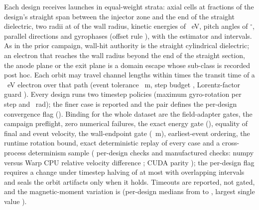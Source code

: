 Each design receives \WlgLaunchesPerCase{} launches in \WlgStrataPerCase{} equal-weight
strata: \WlgCellCount{} axial cells at fractions \WlgCellFractions{} of the design's
straight span between the injector zone and the end of the straight dielectric, two
radii at \WlgRadiusFractions{} of the wall radius, kinetic energies of
\WlgEnergies{}~eV, pitch angles of \WlgPitches$^\circ$, parallel directions
\WlgDirections{} and \WlgGyrophaseCount{} gyrophases (offset rule
\WlgGyrophaseOffsetRule), with the \texttt{\WlgEstimator} estimator and
\texttt{\WlgIntervalMethod} intervals. As in the prior campaign, wall-hit authority
is the straight cylindrical dielectric; an electron that reaches the wall radius
beyond the end of the straight section, the anode plane or the exit plane is a
domain escape whose sub-class is recorded post hoc. Each orbit may travel
\WlgMaxPathLengths{} channel lengths within \WlgMaxTimeFactor{} times the transit
time of a \WlgSlowestEnergy{}~eV electron over that path (event tolerance
\WlgEventTolerance{}~m, step budget \WlgMaxSteps, Lorentz-factor guard
\WlgMaxGamma). Every design runs two timestep policies (maximum gyro-rotation per
step \WlgRotationN{} and \WlgRotationTwoN{}~rad); the finer case is reported and the
pair defines the per-design convergence flag (\WlgReportedCase). Binding for the
whole dataset are the field-adapter gates, the campaign preflight, zero numerical
failures, the exact energy gate (\WlgEnergyGate), equality of final and event
velocity, the wall-endpoint gate (\WlgWallEndpointGate{}~m), earliest-event
ordering, the runtime rotation bound, exact deterministic replay of every case and
a cross-process determinism sample (\WlgPerDesignChecks{} per-design checks and
\WlgManufacturedChecks{} manufactured checks: numpy versus Warp CPU relative
velocity difference \WlgCpuParityDiff; CUDA parity \texttt{\WlgCudaParityStatus});
the per-design flag requires a change under timestep halving of at most
\WlgMaxChangeGate{} with overlapping intervals and seals the orbit artifacts only
when it holds. Timeouts
are reported, not gated, and the magnetic-moment variation is
\texttt{\WlgMuRole} (per-design medians from \WlgMuMedianMin{} to \WlgMuMedianMax,
largest single value \WlgMuMaxMax).

